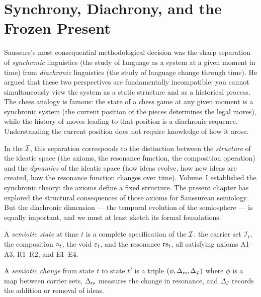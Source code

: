 \section{Synchrony, Diachrony, and the Frozen Present}

Saussure's most consequential methodological decision was the sharp
separation of \emph{synchronic} linguistics (the study of language as
a system at a given moment in time) from \emph{diachronic} linguistics
(the study of language change through time). He argued that these two
perspectives are fundamentally incompatible: you cannot simultaneously
view the system as a static structure and as a historical process.
The chess analogy is famous: the state of a chess game at any given
moment is a synchronic system (the current position of the pieces
determines the legal moves), while the history of moves leading to
that position is a diachronic sequence. Understanding the current
position does not require knowledge of how it arose.

In the $\mathcal{I}$, this separation corresponds to the distinction between
the \emph{structure} of the ideatic space (the axioms, the resonance
function, the composition operation) and the \emph{dynamics} of the
ideatic space (how ideas evolve, how new ideas are created, how the
resonance function changes over time). Volume~I established the
synchronic theory: the axioms define a fixed structure. The present
chapter has explored the structural consequences of those axioms for
Saussurean semiology. But the diachronic dimension --- the temporal
evolution of the semiosphere --- is equally important, and we must
at least sketch its formal foundations.

\begin{definition}
\label{def:semiotic-state}
A \emph{semiotic state} at time $t$ is a complete specification of
the $\mathcal{I}$: the carrier set $\mathcal{I}_t$, the composition
$\circ_t$, the void $\varepsilon_t$, and the resonance $\mathrm{rs}_t$, all
satisfying axioms A1--A3, R1--R2, and E1--E4.
\end{definition}

\begin{definition}
\label{def:semiotic-change}
A \emph{semiotic change} from state $t$ to state $t'$ is a
triple $(\phi, \Delta_{\mathrm{rs}}, \Delta_{\mathcal{I}})$ where $\phi$
is a map between carrier sets, $\Delta_{\mathrm{rs}}$ measures the change
in resonance, and $\Delta_{\mathcal{I}}$ records the addition or
removal of ideas.
\end{definition}

